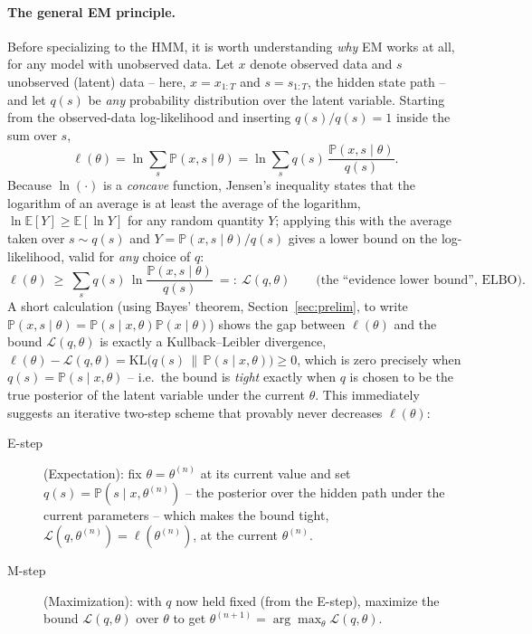 \documentclass[11pt]{article}
\theoremstyle{definition}
\theoremstyle{remark}
\begin{document}
\paragraph{The general EM principle.} Before specializing to the HMM, it is worth understanding \emph{why} EM works at all, for any model with unobserved data. Let $x$ denote observed data and $s$ unobserved (latent) data -- here, $x=x_{1:T}$ and $s=s_{1:T}$, the hidden state path -- and let $q(s)$ be \emph{any} probability distribution over the latent variable. Starting from the observed-data log-likelihood and inserting $q(s)/q(s)=1$ inside the sum over $s$,
\[
\ell(\theta) = \ln\sum_s \mathbb{P}(x,s\mid\theta) = \ln\sum_s q(s)\,\frac{\mathbb{P}(x,s\mid\theta)}{q(s)}.
\]
Because $\ln(\cdot)$ is a \emph{concave} function, Jensen's inequality states that the logarithm of an average is at least the average of the logarithm, $\ln\mathbb{E}[Y]\ge\mathbb{E}[\ln Y]$ for any random quantity $Y$; applying this with the average taken over $s\sim q(s)$ and $Y=\mathbb{P}(x,s\mid\theta)/q(s)$ gives a lower bound on the log-likelihood, valid for \emph{any} choice of $q$:
\[
\ell(\theta) \ \ge\ \sum_s q(s)\,\ln\frac{\mathbb{P}(x,s\mid\theta)}{q(s)} \ =:\ \mathcal{L}(q,\theta) \qquad\text{(the ``evidence lower bound'', ELBO).}
\]
A short calculation (using Bayes' theorem, Section~\ref{sec:prelim}, to write $\mathbb{P}(x,s\mid\theta)=\mathbb{P}(s\mid x,\theta)\mathbb{P}(x\mid\theta)$) shows the gap between $\ell(\theta)$ and the bound $\mathcal{L}(q,\theta)$ is exactly a Kullback--Leibler divergence, $\ell(\theta)-\mathcal L(q,\theta)=\mathrm{KL}\big(q(s)\,\|\,\mathbb{P}(s\mid x,\theta)\big)\ge0$, which is zero precisely when $q(s)=\mathbb{P}(s\mid x,\theta)$ -- i.e.\ the bound is \emph{tight} exactly when $q$ is chosen to be the true posterior of the latent variable under the current $\theta$. This immediately suggests an iterative two-step scheme that provably never decreases $\ell(\theta)$:
\begin{description}
    \item[E-step] (Expectation): fix $\theta=\theta^{(n)}$ at its current value and set $q(s)=\mathbb{P}(s\mid x,\theta^{(n)})$ -- the posterior over the hidden path under the current parameters -- which makes the bound tight, $\mathcal L(q,\theta^{(n)})=\ell(\theta^{(n)})$, at the current $\theta^{(n)}$.
    \item[M-step] (Maximization): with $q$ now held fixed (from the E-step), maximize the bound $\mathcal L(q,\theta)$ over $\theta$ to get $\theta^{(n+1)}=\arg\max_\theta\mathcal L(q,\theta)$.
\end{description}
\end{document}
